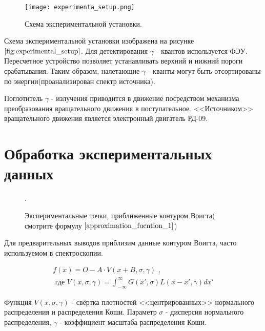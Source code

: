 \documentclass[a4paper, 14pt]{article}
\begin{document}
\begin{figure}[h]
    \begin{center}
        \texttt{[image: experimenta\_setup.png]}
        \caption{Схема экспериментальной установки.}
        \label{fig:experimental_setup}
    \end{center}
\end{figure}

Схема экспериментальной установки изображена на рисунке $\ref{fig:experimental_setup}$.
Для детектирования $\gamma$ - квантов используется ФЭУ. Пересчетное устройство позволяет
устанавливать верхний и нижний пороги срабатывания. Таким образом, налетающие $\gamma$ - кванты
могут быть отсортированы по энергии(проанализирован спектр источника).

Поглотитель $\gamma$ - излучения приводится в движение посредством механизма преобразования
вращательного движения в поступательное. <<Источником>> вращательного движения является
электронный двигатель РД-09.






\section*{\textcolor{header}{Обработка экспериментальных данных}}

\begin{figure}[h]
    \begin{center}
        
    \end{center}
    \caption{Экспериментальные точки, приближенные контуром Воигта( смотрите формулу $\ref{approximation_fucntion_1}$)}.
    \label{fig:raw_data}
\end{figure}

Для предварительных выводов приблизим данные контуром Воигта, часто
используемом в спектроскопии.

\begin{equation}
    \begin{aligned}
        f(x) = O - A \cdot V(x + B, \sigma, \gamma) \text{ ,} \\
        \text{ где } V(x, \sigma, \gamma) = \int_{- \infty}^{\infty} G(x', \sigma) L(x - x', \gamma) dx'
    \end{aligned}
    \label{approximation_fucntion_1}
\end{equation}

Функция $V(x, \sigma, \gamma)$ - свёртка плотностей <<центрированных>> нормального распределения и распределения Коши.
Параметр $\sigma$ - дисперсия нормального распределения, $\gamma$ - коэффициент масштаба распределения Коши.
\end{document}
